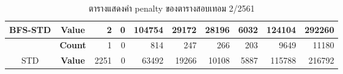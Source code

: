 \begin{table}[]
{\begin{tabular}{@{}ccrrrrrrrr@{}}
    \multirow{-2}{*}{BFS-STD}                    & \textbf{Value}                        & 2                           & 0                        & 104754                       & 29172                        & 28196                        & 6032                        & 124104                        & 292260                        \\ \midrule
    {\color[HTML]{FE0000} }                      & {\color[HTML]{FE0000} \textbf{Count}} & {\color[HTML]{FE0000} 1}    & {\color[HTML]{FE0000} 0} & {\color[HTML]{FE0000} 814}   & {\color[HTML]{FE0000} 247}   & {\color[HTML]{FE0000} 266}   & {\color[HTML]{FE0000} 203}  & {\color[HTML]{FE0000} 9649}   & {\color[HTML]{FE0000} 11180}  \\ \cmidrule(l){2-10} 
    \multirow{-2}{*}{{\color[HTML]{FE0000} STD}} & {\color[HTML]{FE0000} \textbf{Value}} & {\color[HTML]{FE0000} 2251} & {\color[HTML]{FE0000} 0} & {\color[HTML]{FE0000} 63492} & {\color[HTML]{FE0000} 19266} & {\color[HTML]{FE0000} 10108} & {\color[HTML]{FE0000} 5887} & {\color[HTML]{FE0000} 115788} & {\color[HTML]{FE0000} 216792} \\ \bottomrule
    \end{tabular}%
    }
    \caption{ตารางแสดงค่า penalty ของตารางสอบเทอม 2/2561}
    \label{tab:result_table_261}
\end{table}
